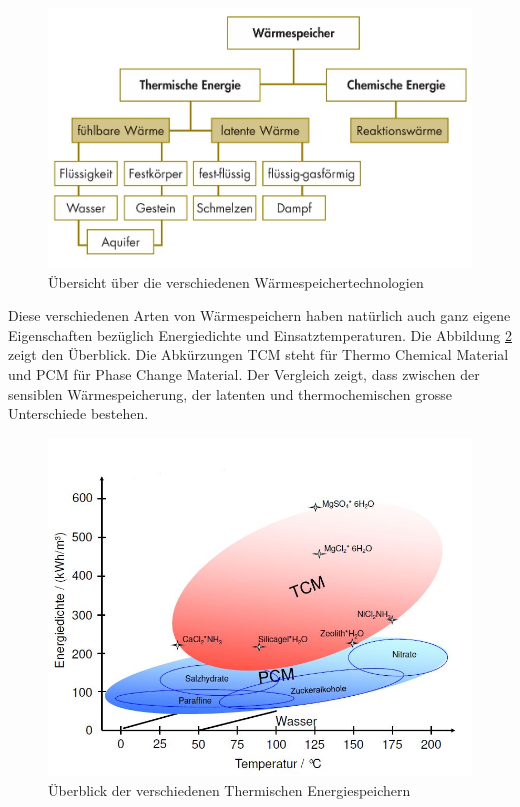 \documentclass[11pt,a4paper]{scrartcl}
\begin{document}
\begin{figure}[h]
\begin{center}
\includegraphics[scale=0.3]{images/speicher.jpg}
\caption{Übersicht über die verschiedenen Wärmespeichertechnologien
\cite{BINE1}}
\label{fig:Wärmespeicher}
\end{center}
\end{figure}


Diese verschiedenen Arten von Wärmespeichern haben natürlich auch ganz eigene
Eigenschaften bezüglich Energiedichte und Einsatztemperaturen. Die Abbildung
\ref{fig:temperaturenergiedichte} zeigt den Überblick. Die Abkürzungen TCM steht
für Thermo Chemical Material und PCM für Phase Change Material. Der
Vergleich zeigt, dass zwischen der sensiblen Wärmespeicherung, der latenten
und thermochemischen grosse Unterschiede bestehen.

\begin{figure}[h]
\begin{center}
\includegraphics[scale=0.5]{images/temperaturenergiedichte.jpg}
\caption{Überblick der verschiedenen Thermischen Energiespeichern \cite{zaebayern}}
\label{fig:temperaturenergiedichte}
\end{center}
\end{figure}
\end{document}
